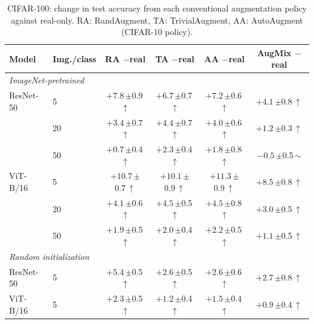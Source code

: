 \begin{table}[htbp]
\centering
\footnotesize
\setlength{\tabcolsep}{4pt}
\caption{CIFAR-100: change in test accuracy from each conventional augmentation policy against real-only. RA: RandAugment, TA: TrivialAugment, AA: AutoAugment (CIFAR-10 policy).}
\label{tab:paper-policies}
\begin{tabular}{llcccc}
\toprule
Model & Img./class & \shortstack{RA\\$-$real} & \shortstack{TA\\$-$real} & \shortstack{AA\\$-$real} & \shortstack{AugMix\\$-$real} \\
\midrule
\multicolumn{6}{l}{\textit{ImageNet-pretrained}} \\
ResNet-50 & 5 & $+7.8$\,{\scriptsize$\pm$0.9}\,$\uparrow$ & $+6.7$\,{\scriptsize$\pm$0.7}\,$\uparrow$ & $+7.2$\,{\scriptsize$\pm$0.6}\,$\uparrow$ & $+4.1$\,{\scriptsize$\pm$0.8}\,$\uparrow$ \\
 & 20 & $+3.4$\,{\scriptsize$\pm$0.7}\,$\uparrow$ & $+4.4$\,{\scriptsize$\pm$0.7}\,$\uparrow$ & $+4.0$\,{\scriptsize$\pm$0.6}\,$\uparrow$ & $+1.2$\,{\scriptsize$\pm$0.3}\,$\uparrow$ \\
 & 50 & $+0.7$\,{\scriptsize$\pm$0.4}\,$\uparrow$ & $+2.3$\,{\scriptsize$\pm$0.4}\,$\uparrow$ & $+1.8$\,{\scriptsize$\pm$0.8}\,$\uparrow$ & $-0.5$\,{\scriptsize$\pm$0.5}\,$\sim$ \\
\addlinespace[2pt]
ViT-B/16 & 5 & $+10.7$\,{\scriptsize$\pm$0.7}\,$\uparrow$ & $+10.1$\,{\scriptsize$\pm$0.9}\,$\uparrow$ & $+11.3$\,{\scriptsize$\pm$0.9}\,$\uparrow$ & $+8.5$\,{\scriptsize$\pm$0.8}\,$\uparrow$ \\
 & 20 & $+4.1$\,{\scriptsize$\pm$0.6}\,$\uparrow$ & $+4.5$\,{\scriptsize$\pm$0.5}\,$\uparrow$ & $+4.5$\,{\scriptsize$\pm$0.8}\,$\uparrow$ & $+3.0$\,{\scriptsize$\pm$0.5}\,$\uparrow$ \\
 & 50 & $+1.9$\,{\scriptsize$\pm$0.5}\,$\uparrow$ & $+2.0$\,{\scriptsize$\pm$0.4}\,$\uparrow$ & $+2.2$\,{\scriptsize$\pm$0.5}\,$\uparrow$ & $+1.1$\,{\scriptsize$\pm$0.5}\,$\uparrow$ \\
\midrule
\multicolumn{6}{l}{\textit{Random initialization}} \\
ResNet-50 & 5 & $+5.4$\,{\scriptsize$\pm$0.5}\,$\uparrow$ & $+2.6$\,{\scriptsize$\pm$0.5}\,$\uparrow$ & $+2.6$\,{\scriptsize$\pm$0.6}\,$\uparrow$ & $+2.7$\,{\scriptsize$\pm$0.8}\,$\uparrow$ \\
\addlinespace[2pt]
ViT-B/16 & 5 & $+2.3$\,{\scriptsize$\pm$0.5}\,$\uparrow$ & $+1.2$\,{\scriptsize$\pm$0.4}\,$\uparrow$ & $+1.5$\,{\scriptsize$\pm$0.4}\,$\uparrow$ & $+0.9$\,{\scriptsize$\pm$0.4}\,$\uparrow$ \\
\bottomrule
\end{tabular}
\end{table}

